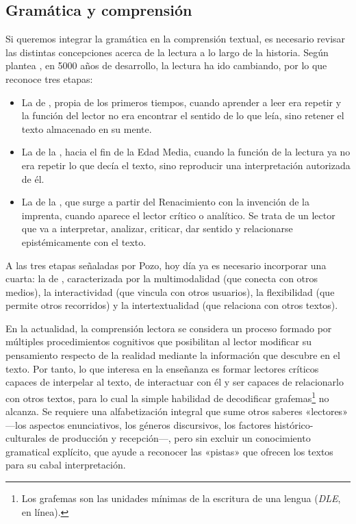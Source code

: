 \subsection{Gramática y comprensión}

Si queremos integrar la gramática en la comprensión textual, es necesario
revisar las distintas concepciones acerca de la lectura a lo largo de la
historia. Según plantea \textcite{pozo2014}, en 5000 años de desarrollo, la
lectura ha ido cambiando, por lo que reconoce tres etapas:

\begin{itemize}
  \item La de , propia de los primeros
        tiempos, cuando aprender a leer era repetir y la función del lector no
        era encontrar el sentido de lo que leía, sino retener el texto
        almacenado en su mente.
  \item La de la , hacia el fin de la Edad Media,
        cuando la función de la lectura ya no era repetir lo que decía el
        texto, sino reproducir una interpretación autorizada de él.
  \item La de la , que surge a partir del
        Renacimiento con la invención de la imprenta, cuando aparece el lector
        crítico o analítico. Se trata de un lector que va a interpretar,
        analizar, criticar, dar sentido y relacionarse epistémicamente con el
        texto.
\end{itemize}

A las tres etapas señaladas por Pozo, hoy día ya es necesario incorporar una
cuarta: la de , caracterizada por la
multimodalidad (que conecta con otros medios), la interactividad (que vincula
con otros usuarios), la flexibilidad (que permite otros recorridos) y la
intertextualidad (que relaciona con otros textos).


En la actualidad, la comprensión lectora se considera un proceso formado por
múltiples procedimientos cognitivos que posibilitan al lector modificar su
pensamiento respecto de la realidad mediante la información que descubre en el
texto. Por tanto, lo que interesa en la enseñanza es formar lectores críticos
capaces de interpelar al texto, de interactuar con él y ser capaces de
relacionarlo con otros textos, para lo cual la simple habilidad de decodificar
grafemas\footnote{Los grafemas son las unidades mínimas de la escritura de una
lengua (\textit{DLE}, en línea).} no alcanza. Se requiere una alfabetización
integral que sume otros saberes «lectores» ---los aspectos enunciativos, los
géneros discursivos, los factores histórico-culturales de producción y
recepción---, pero sin excluir un conocimiento gramatical explícito, que ayude
a reconocer las «pistas» que ofrecen los textos para su cabal interpretación.

